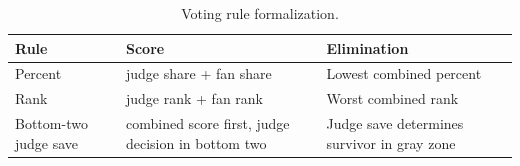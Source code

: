 \begin{table}
\caption{Voting rule formalization.}
\begin{tabular}{lll}
\toprule
Rule & Score & Elimination \\
\midrule
Percent & judge share + fan share & Lowest combined percent \\
Rank & judge rank + fan rank & Worst combined rank \\
Bottom-two judge save & combined score first, judge decision in bottom two & Judge save determines survivor in gray zone \\
\bottomrule
\end{tabular}
\end{table}
